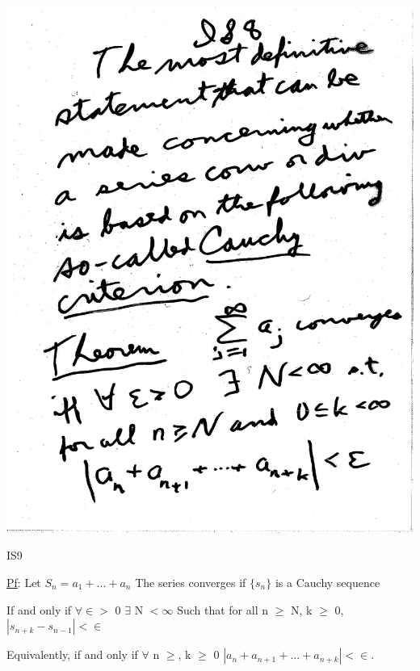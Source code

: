 \documentclass[10pt,a4paper]{article}
\begin{document}
\includegraphics[scale=.5]{Pages/IS_8}

\newpage
 
\begin{center}
IS9
\end{center}

\underline{Pf}: 
Let $S_n = a_1 +...+a_n$
The series converges if $\{s_n\}$ is a Cauchy sequence 

If and only if $\forall \in >$ 0 $\exists$ N $< \infty$ 
Such that for all n $\ge$ N, k $\ge$ 0,
$|s_{n+k} - s_{n-1}|  < \in$ 

Equivalently, if and only if $\forall$ n $\ge$, k $\ge$ 0
$|a_n + a_{n+1} + ... + a_{n+k}| < \in$.
\end{document}
